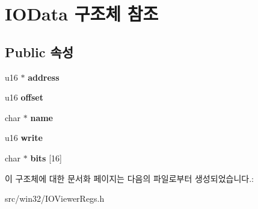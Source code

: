 \hypertarget{struct_i_o_data}{}\section{I\+O\+Data 구조체 참조}
\label{struct_i_o_data}
\subsection*{Public 속성}
\begin{DoxyCompactItemize}
\item 
\mbox{\label{struct_i_o_data_a5fcb4807916458a82aef9ed9b51a175e}} 
u16 $\ast$ {\bfseries address}
\item 
\mbox{\label{struct_i_o_data_a233a9f32b3427e87b64dc90fe22f9b02}} 
u16 {\bfseries offset}
\item 
\mbox{\label{struct_i_o_data_ae8309728b994911239463cf8eabbfe17}} 
char $\ast$ {\bfseries name}
\item 
\mbox{\label{struct_i_o_data_a63aed2fbb67f748415d947e0c403ef2c}} 
u16 {\bfseries write}
\item 
\mbox{\label{struct_i_o_data_a31e899a3963226dc851ee4dc9f92a0c1}} 
char $\ast$ {\bfseries bits} \mbox{[}16\mbox{]}
\end{DoxyCompactItemize}


이 구조체에 대한 문서화 페이지는 다음의 파일로부터 생성되었습니다.\+:\begin{DoxyCompactItemize}
\item 
src/win32/I\+O\+Viewer\+Regs.\+h\end{DoxyCompactItemize}
